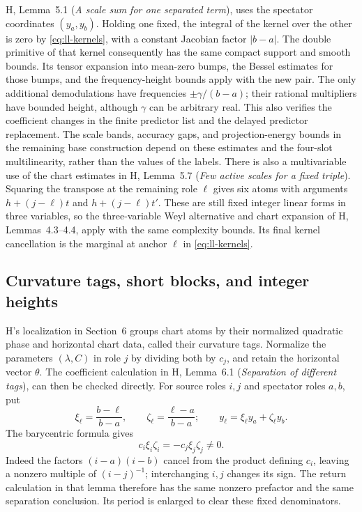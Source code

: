 H, Lemma~5.1 (\emph{A scale sum for one separated term}),
uses the spectator coordinates $(y_a,y_b)$.  Holding one fixed, the
integral of the kernel over the other is zero by
\eqref{eq:ll-kernels}, with a constant Jacobian factor $|b-a|$.
The double primitive of that kernel consequently has the same
compact support and smooth bounds.  Its tensor expansion into
mean-zero bumps, the Bessel estimates for those bumps, and the
frequency-height bounds apply with the new pair.  The only additional
demodulations have frequencies $\pm\gamma/(b-a)$; their rational
multipliers have bounded height, although $\gamma$ can be arbitrary
real.  This also verifies the coefficient changes
in the finite predictor list and the delayed predictor replacement.
The scale bands, accuracy gaps, and projection-energy bounds in the
remaining base construction depend on these estimates and the
four-slot multilinearity, rather than the values of the labels.
There is also a multivariable use of the chart estimates in H,
Lemma~5.7 (\emph{Few active scales for a fixed triple}).  Squaring
the transpose at the remaining role $\ell$ gives six atoms with
arguments $h+(j-\ell)t$ and $h+(j-\ell)t'$.  These are still fixed
integer linear forms in three variables, so the three-variable Weyl
alternative and chart expansion of H, Lemmas~4.3--4.4, apply with
the same complexity bounds.  Its final kernel cancellation is
the marginal at anchor $\ell$ in \eqref{eq:ll-kernels}.

\subsection{Curvature tags, short blocks, and integer heights}

H's localization in Section~6 groups chart atoms by their normalized
quadratic phase and horizontal chart data, called their curvature
tags.  Normalize the parameters $(\lambda,C)$ in role $j$ by
dividing both by $c_j$, and retain the horizontal vector $\theta$.
The coefficient calculation in H, Lemma~6.1 (\emph{Separation of different tags}), can
then be checked directly.  For source roles $i,j$ and spectator roles
$a,b$, put
\[
 \xi_\ell=\frac{b-\ell}{b-a},\qquad
 \zeta_\ell=\frac{\ell-a}{b-a};
 \qquad y_\ell=\xi_\ell y_a+\zeta_\ell y_b.
\]
The barycentric formula gives
\begin{equation}
 c_i\xi_i\zeta_i=-c_j\xi_j\zeta_j\ne0.
 \label{eq:ll-tag-identity}
\end{equation}
Indeed the factors $(i-a)(i-b)$ cancel from the product defining
$c_i$, leaving a nonzero multiple of $(i-j)^{-1}$; interchanging
$i,j$ changes its sign.  The return calculation in that lemma
therefore has the same nonzero prefactor and the same separation
conclusion.  Its period is enlarged to clear these fixed denominators.

